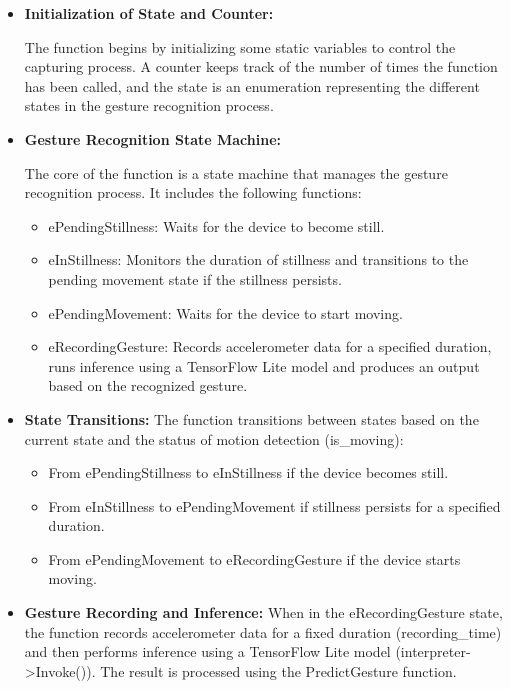 \begin{itemize}
	
	\item \textbf{Initialization of State and Counter:}
	
	The function begins by initializing some static variables to control the capturing process. A counter keeps track of the number of times the function has been called, and the state is an enumeration representing the different states in the gesture recognition process.
	
	\item \textbf{Gesture Recognition State Machine:}
	
	The core of the function is a state machine that manages the gesture recognition process. It includes the following functions:
	
	\begin{itemize}\label{statemanagement}
		
		\item ePendingStillness: Waits for the device to become still.
		\item eInStillness: Monitors the duration of stillness and transitions to the pending movement state if the stillness persists.
		\item ePendingMovement: Waits for the device to start moving.
		\item eRecordingGesture: Records accelerometer data for a specified duration, runs inference using a TensorFlow Lite model and produces an output based on the recognized gesture.
		
	\end{itemize}
	
	\item \textbf{State Transitions:}
	The function transitions between states based on the current state and the status of motion detection (is\_moving):
	
	\begin{itemize}
		
		\item From ePendingStillness to eInStillness if the device becomes still.
		\item From eInStillness to ePendingMovement if stillness persists for a specified duration.
		\item From ePendingMovement to eRecordingGesture if the device starts moving.
		
	\end{itemize}
	\item \textbf{Gesture Recording and Inference:}
	When in the eRecordingGesture state, the function records accelerometer data for a fixed duration (recording\_time) and then performs inference using a TensorFlow Lite model (interpreter->Invoke()). The result is processed using the PredictGesture function.
	

\end{itemize}
